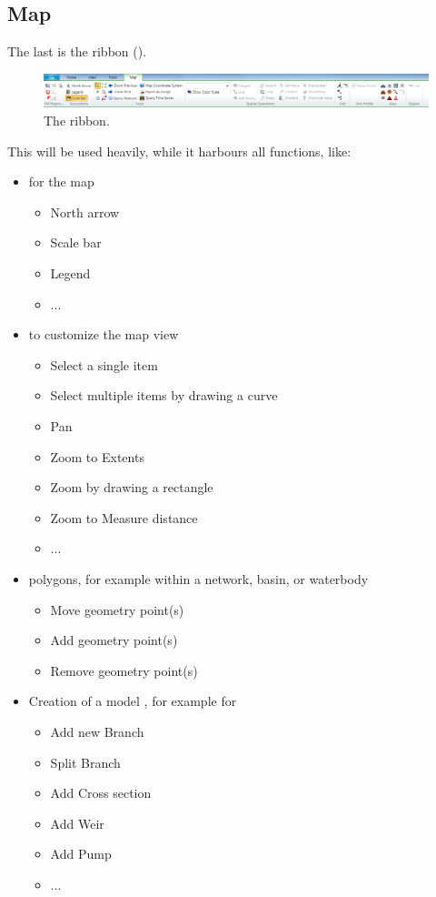 \subsection{Map}
\label{ssec:ribbonmap}
The last  is the  ribbon ().
\begin{figure}[H]
	\centering
	\includegraphics[width=1.0\textwidth]{Figures/Chapter_overview/ribbon_map.png}
	\caption{The  ribbon.}
	\label{fig:ribbonmap}
\end{figure}
%
This will be used heavily, while it harbours all  functions, like:
\begin{itemize}
\item {} for the map
\begin{itemize}
	\item North arrow
	\item Scale bar
	\item Legend
	\item ...
\end{itemize}
\item {} to customize the map view
\begin{itemize}
	\item Select a single item
	\item Select multiple items by drawing a curve
	\item Pan
	\item Zoom to Extents
	\item Zoom by drawing a rectangle
	\item Zoom to Measure distance
	\item ...
\end{itemize}
\item {} polygons, for example within a network, basin, or waterbody
\begin{itemize}
	\item Move geometry point(s)
	\item Add geometry point(s)
	\item Remove geometry point(s)
\end{itemize}
\item Creation of a model , for example for \dflow
\begin{itemize}
	\item Add new Branch
	\item Split Branch
	\item Add Cross section
	\item Add Weir
	\item Add Pump
	\item ...
\end{itemize}
\end{itemize}
